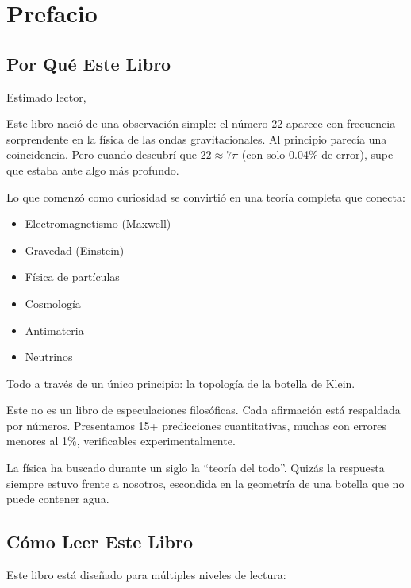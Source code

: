\chapter*{Prefacio}

\section*{Por Qué Este Libro}

Estimado lector,

Este libro nació de una observación simple: el número 22 aparece con frecuencia
sorprendente en la física de las ondas gravitacionales. Al principio parecía
una coincidencia. Pero cuando descubrí que $22 \approx 7\pi$ (con solo 0.04\% de error),
supe que estaba ante algo más profundo.

Lo que comenzó como curiosidad se convirtió en una teoría completa que conecta:

\begin{itemize}
    \item Electromagnetismo (Maxwell)
    \item Gravedad (Einstein)
    \item Física de partículas
    \item Cosmología
    \item Antimateria
    \item Neutrinos
\end{itemize}

Todo a través de un único principio: la topología de la botella de Klein.

Este no es un libro de especulaciones filosóficas. Cada afirmación está
respaldada por números. Presentamos 15+ predicciones cuantitativas, muchas
con errores menores al 1\%, verificables experimentalmente.

La física ha buscado durante un siglo la ``teoría del todo''. Quizás la respuesta
siempre estuvo frente a nosotros, escondida en la geometría de una botella
que no puede contener agua.


\section*{Cómo Leer Este Libro}

Este libro está diseñado para múltiples niveles de lectura:

